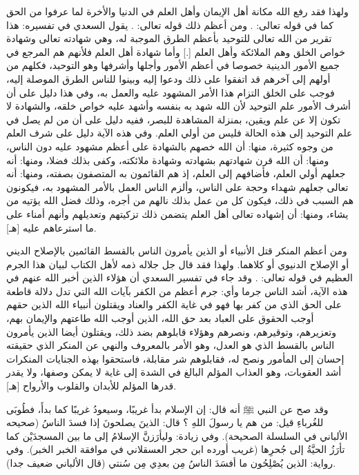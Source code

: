 ولهذا فقد رفع الله مكانة أهل الإيمان وأهل العلم في الدنيا والأخرة لما عرفوا من الحق كما في قوله تعالى:
\quranayah*[58][11][19]{\footnotesize \surahname*[58]}.
ومن أعظم ذلك قوله تعالى:
\quranayah*[3][18]{\footnotesize \surahname*[3]}.
يقول السعدي في تفسيره:
هذا تقرير من الله تعالى للتوحيد بأعظم الطرق الموجبة له، وهي شهادته تعالى وشهادة خواص الخلق وهم الملائكة وأهل العلم [.] وأما شهادة أهل العلم فلأنهم هم المرجع في جميع الأمور الدينية خصوصا في أعظم الأمور وأجلها وأشرفها وهو التوحيد، فكلهم من أولهم إلى آخرهم قد اتفقوا على ذلك ودعوا إليه وبينوا للناس الطرق الموصلة إليه، فوجب على الخلق التزام هذا الأمر المشهود عليه والعمل به، وفي هذا دليل على أن أشرف الأمور علم التوحيد لأن الله شهد به بنفسه وأشهد عليه خواص خلقه، والشهادة لا تكون إلا عن علم ويقين، بمنزلة المشاهدة للبصر، ففيه دليل على أن من لم يصل في علم التوحيد إلى هذه الحالة فليس من أولي العلم. وفي هذه الآية دليل على شرف العلم من وجوه كثيرة، منها: أن الله خصهم بالشهادة على أعظم مشهود عليه دون الناس، ومنها: أن الله قرن شهادتهم بشهادته وشهادة ملائكته، وكفى بذلك فضلا، ومنها: أنه جعلهم أولي العلم، فأضافهم إلى العلم، إذ هم القائمون به المتصفون بصفته، ومنها: أنه تعالى جعلهم شهداء وحجة على الناس، وألزم الناس العمل بالأمر المشهود به، فيكونون هم السبب في ذلك، فيكون كل من عمل بذلك نالهم من أجره، وذلك فضل الله يؤتيه من يشاء، ومنها: أن إشهاده تعالى أهل العلم يتضمن ذلك تزكيتهم وتعديلهم وأنهم أمناء على ما استرعاهم عليه [هـ].


ومن أعظم المنكر قتل الأنبياء أو الذين يأمرون الناس بالقسط القائمين بالإصلاح الديني أو الإصلاح الدنيوي أو كلاهما. ولهذا فقد قال جل جلاله ذمه لأهل الكتاب لبيان هذا الجرم العظيم في قوله تعالى:
\quranayah*[3][21]{\footnotesize \surahname*[3]}. وقد جاء في تفسير السعدي أن هؤلاء الذين أخبر الله عنهم في هذه الآية، أشد الناس جرما وأي: جرم أعظم من الكفر بآيات الله التي تدل دلالة قاطعة على الحق الذي من كفر بها فهو في غاية الكفر والعناد ويقتلون أنبياء الله الذين حقهم أوجب الحقوق على العباد بعد حق الله، الذين أوجب الله طاعتهم والإيمان بهم، وتعزيرهم، وتوقيرهم، ونصرهم وهؤلاء قابلوهم بضد ذلك، ويقتلون أيضا الذين يأمرون الناس بالقسط الذي هو العدل، وهو الأمر بالمعروف والنهي عن المنكر الذي حقيقته إحسان إلى المأمور ونصح له، فقابلوهم شر مقابلة، فاستحقوا بهذه الجنايات المنكرات أشد العقوبات، وهو العذاب المؤلم البالغ في الشدة إلى غاية لا يمكن وصفها، ولا يقدر قدرها المؤلم للأبدان والقلوب والأرواح [هـ]. 

وقد صح عن النبي ﷺ أنه قال: إن الإسلام بدأ غريبًا، وسيعودُ غريبًا كما بدأَ، فطُوبَى للغُرباءِ قيل: من هم يا رسولَ اللهِ ؟ قال: الذينَ يصلحونَ إذا فسدَ الناسُ {\footnotesize (صحيحه الألباني في السلسلة الصحيحة)}. وفي زيادة: وليأرَزنَّ الإسلامُ إلى ما بين المسجدَيْن كما تأرَزُ الحيَّةُ إلى جُحرِها {\footnotesize (غريب أورده ابن حجر العسقلاني في موافقة الخبر الخبر)}. وفي رواية: الذين يُصْلِحُون ما أفسَدَ الناسُ مِن بعدِي مِن سُنتي {\footnotesize (قال الألباني ضعيف جدا)}.

